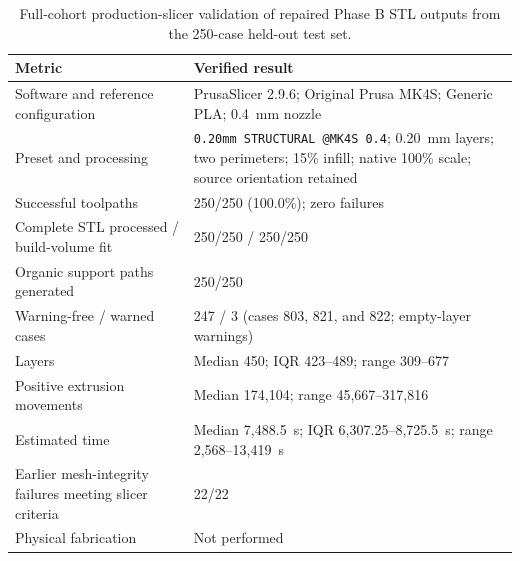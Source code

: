 \documentclass[anonymous]{iopjournal}
\begin{document}
\begin{table}[!htbp]
\centering
\caption{Full-cohort production-slicer validation of repaired Phase B STL outputs from the 250-case held-out test set.}
\label{tab:production-slicer-validation}
\begin{threeparttable}
\footnotesize
\begin{tabularx}{0.92\textwidth}{L{0.43\textwidth}Y}
\toprule
\textbf{Metric} & \textbf{Verified result} \\
\midrule
Software and reference configuration & PrusaSlicer 2.9.6; Original Prusa MK4S; Generic PLA; \SI{0.4}{mm} nozzle \\
Preset and processing & \texttt{0.20mm STRUCTURAL @MK4S 0.4}; \SI{0.20}{mm} layers; two perimeters; 15\% infill; native 100\% scale; source orientation retained \\
Successful toolpaths & 250/250 (100.0\%); zero failures \\
Complete STL processed / build-volume fit & 250/250 / 250/250 \\
Organic support paths generated & 250/250 \\
Warning-free / warned cases & 247 / 3 (cases 803, 821, and 822; empty-layer warnings) \\
Layers & Median 450; IQR 423--489; range 309--677 \\
Positive extrusion movements & Median 174{,}104; range 45{,}667--317{,}816 \\
Estimated time & Median 7{,}488.5~s; IQR 6{,}307.25--8{,}725.5~s; range 2{,}568--13{,}419~s \\
Earlier mesh-integrity failures meeting slicer criteria & 22/22 \\
Physical fabrication & Not performed \\
\bottomrule
\end{tabularx}
\end{threeparttable}
\end{table}
\end{document}

